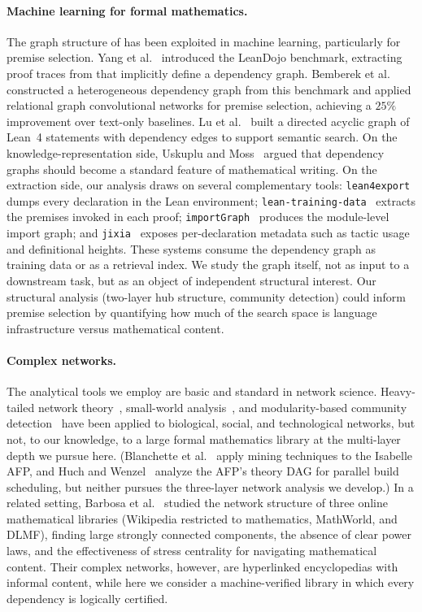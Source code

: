 \paragraph{Machine learning for formal mathematics.}
The graph structure of  has been exploited in machine learning, particularly for premise selection. Yang et al.~\cite{leandojo} introduced the LeanDojo benchmark, extracting proof traces from  that implicitly define a dependency graph. Bemberek et al.~\cite{bemberek2025} constructed a heterogeneous dependency graph from this benchmark and applied relational graph convolutional networks for premise selection, achieving a $25\%$ improvement over text-only baselines. Lu et al.~\cite{leanfinder} built a directed acyclic graph of Lean~4 statements with dependency edges to support semantic search. On the knowledge-representation side, Uskuplu and Moss~\cite{knowtex2025} argued that dependency graphs should become a standard feature of mathematical writing. On the extraction side, our analysis draws on several complementary tools: \texttt{lean4export}~\cite{lean4export} dumps every declaration in the Lean environment; \texttt{lean-training-data}~\cite{lean_training_data} extracts the premises invoked in each proof; \texttt{importGraph}~\cite{importgraph} produces the module-level import graph; and \texttt{jixia}~\cite{jixia2024} exposes per-declaration metadata such as tactic usage and definitional heights. These systems consume the dependency graph as training data or as a retrieval index. We study the graph itself, not as input to a downstream task, but as an object of independent structural interest. Our structural analysis (two-layer hub structure, community detection) could inform premise selection by quantifying how much of the search space is language infrastructure versus mathematical content.

\paragraph{Complex networks.}
The analytical tools we employ are basic and standard in network science. Heavy-tailed network theory~\cite{barabasi1999}, small-world analysis~\cite{watts1998}, and modularity-based community detection~\cite{newman2004,blondel2008} have been applied to biological, social, and technological networks, but not, to our knowledge, to a large formal mathematics library at the multi-layer depth we pursue here. (Blanchette et al.~\cite{blanchette2015} apply mining techniques to the Isabelle AFP, and Huch and Wenzel~\cite{huch2024} analyze the AFP's theory DAG for parallel build scheduling, but neither pursues the three-layer network analysis we develop.) In a related setting, Barbosa et al.~\cite{barbosa2013} studied the network structure of three online mathematical libraries (Wikipedia restricted to mathematics, MathWorld, and DLMF), finding large strongly connected components, the absence of clear power laws, and the effectiveness of stress centrality for navigating mathematical content. Their complex networks, however, are hyperlinked encyclopedias with informal content, while here we consider a machine-verified library in which every dependency is logically certified.

